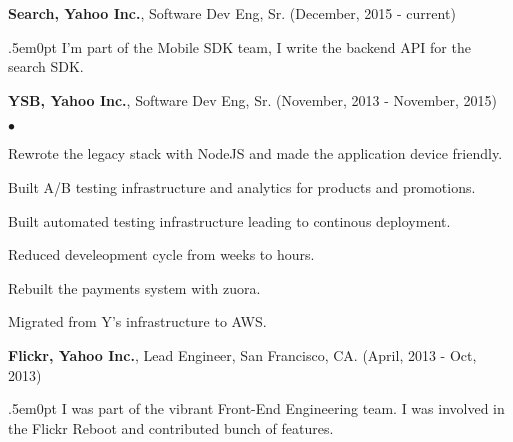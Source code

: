 \documentclass[margin, line, 10pt]{res}
\newenvironment{list2}{
  \begin{list}{$\bullet$}{%
      \setlength{\itemsep}{0in}
      \setlength{\parsep}{0in} \setlength{\parskip}{0in}
      \setlength{\topsep}{0in} \setlength{\partopsep}{0in}
      \setlength{\leftmargin}{0.2in}}}{\end{list}}
\begin{document}
\begin{resume}
{\Large {\bf Search, Yahoo Inc.}}, Software Dev Eng, Sr. (December, 2015 - current)\\
\begin{adjustwidth}{.5em}{0pt}
  I'm part of the Mobile SDK team, I write the backend API for the search SDK.
\end{adjustwidth}
\vspace{.05cm}

{\Large {\bf YSB, Yahoo Inc.}}, Software Dev Eng, Sr. (November, 2013 - November, 2015)\\
\vspace{-.1cm}
\begin{list2}
\vspace{.1cm}
\item Rewrote the legacy stack with NodeJS and made the application device friendly.
\item Built A/B testing infrastructure and analytics for products and promotions.
\item Built automated testing infrastructure leading to continous deployment.
\item Reduced develeopment cycle from weeks to hours.
\item Rebuilt the payments system with zuora.
\item Migrated from Y's infrastructure to AWS.
\end{list2}
\vspace{.05cm}

{\Large {\bf Flickr, Yahoo Inc.}}, Lead Engineer, San Francisco, CA.  \hfill (April, 2013 - Oct, 2013)\\
\vspace{-.1cm}
\begin{adjustwidth}{.5em}{0pt}
  I was part of the vibrant Front-End Engineering team. I was involved in the Flickr Reboot and contributed bunch of features.
\end{adjustwidth}


\end{resume}
\end{document}
